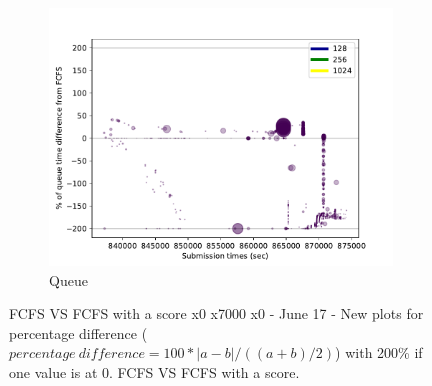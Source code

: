 \documentclass[a4paper]{article}
\begin{document}
\begin{figure}[H]
\begin{subfigure}[b]{0.4\linewidth}\centering\includegraphics[width=1\linewidth]{MBSS/plot/Queue_times_Fcfs_Fcfs_with_a_score_x0_x70000_x0_2022-02-08->2022-02-08_reduced_95_128_4_256_1_1024.pdf}\caption{Queue}\end{subfigure}\caption{FCFS VS FCFS with a score x0 x7000 x0 - June 17 - New plots for percentage difference ($percentage~difference = 100 * |a - b| / ((a + b) / 2)$) with 200\% if one value is at 0. FCFS VS FCFS with a score.}\end{figure}
\end{document}
